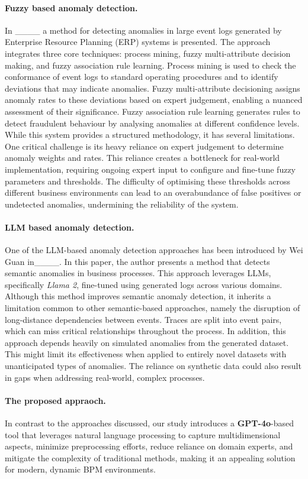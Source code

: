 \paragraph{Fuzzy based anomaly detection.}
In ____ a method for detecting anomalies in large event logs generated by Enterprise Resource Planning (ERP) systems is presented. The approach integrates three core techniques: process mining, fuzzy multi-attribute decision making, and fuzzy association rule learning.
%
Process mining is used to check the conformance of event logs to standard operating procedures and to identify deviations that may indicate anomalies.
Fuzzy multi-attribute decisioning assigns anomaly rates to these deviations based on expert judgement, enabling a nuanced assessment of their significance.
Fuzzy association rule learning generates rules to detect fraudulent behaviour by analysing anomalies at different confidence levels.
%
While this system provides a structured methodology, it has several limitations. One critical challenge is its heavy reliance on expert judgement to determine anomaly weights and rates. This reliance creates a bottleneck for real-world implementation, requiring ongoing expert input to configure and fine-tune fuzzy parameters and thresholds. The difficulty of optimising these thresholds across different business environments can lead to an overabundance of false positives or undetected anomalies, undermining the reliability of the system.

\paragraph{LLM based anomaly detection.}
One of the LLM-based anomaly detection approaches has been introduced by Wei Guan in____. In this paper, the author presents a method that detects semantic anomalies in business processes. This approach leverages LLMs, specifically \textit{Llama 2}, fine-tuned using generated logs across various domains. 
%
Although this method improves semantic anomaly detection, it inherits a limitation common to other semantic-based approaches, namely the disruption of long-distance dependencies between events. Traces are split into event pairs, which can miss critical relationships throughout the process.
%
In addition, this approach depends heavily on simulated anomalies from the generated dataset. This might limit its effectiveness when applied to entirely novel datasets with unanticipated types of anomalies. The reliance on synthetic data could also result in gaps when addressing real-world, complex processes.

\paragraph{The proposed appraoch.}
In contrast to the approaches discussed, our study introduces a \textbf{GPT-4o}-based tool that leverages natural language processing to capture multidimensional aspects, minimize preprocessing efforts, reduce reliance on domain experts, and mitigate the complexity of traditional methods, making it an appealing solution for modern, dynamic BPM environments.